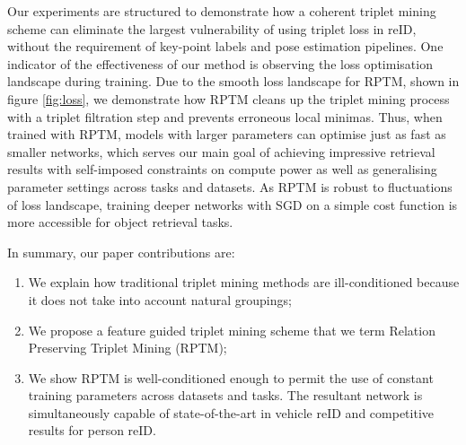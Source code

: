 \documentclass[10pt,twocolumn,letterpaper]{article}
\begin{document}
 Our experiments are structured to demonstrate how a coherent triplet mining scheme can eliminate the largest vulnerability of using triplet loss in reID, without the requirement of key-point labels and pose estimation pipelines. One indicator of the effectiveness of our method is observing the loss optimisation landscape during training. Due to the smooth loss landscape for RPTM, shown in figure \ref{fig:loss}, we demonstrate how RPTM cleans up the triplet mining process with a triplet filtration step and prevents erroneous local minimas. Thus, when trained with RPTM, models with larger parameters can optimise just as fast as smaller networks, which serves our main goal of achieving impressive retrieval results with self-imposed constraints on compute power as well as generalising parameter settings across tasks and datasets. As RPTM is robust to fluctuations of loss landscape, training deeper networks with SGD on a simple cost function is more accessible for object retrieval tasks. 

  In summary, our paper  contributions are:
\begin{enumerate}
    \item We explain how traditional triplet mining methods are  ill-conditioned because it does not take into account natural groupings; 
   \item We propose a feature guided triplet mining scheme that we term Relation Preserving Triplet Mining (RPTM);
  \item We show  RPTM is well-conditioned enough to permit the  use of constant training parameters across  datasets and tasks.  The resultant network is simultaneously capable of  state-of-the-art in  vehicle reID and competitive results for person reID.
\end{enumerate}
\end{document}
